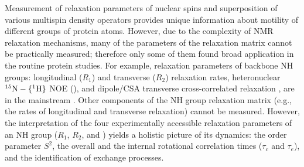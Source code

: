 \documentclass[twocolumn]{svjour3}           %
\begin{document}
Measurement of relaxation parameters of nuclear spins and superposition
of various multispin density operators provides unique information about motility
of different groups of protein atoms. However, due to the complexity of
NMR relaxation mechanisms, many of the parameters of the relaxation 
matrix cannot be practically measured; therefore only some of them 
found broad application in the routine protein studies. For example, 
relaxation parameters of backbone NH groups: \nlab{} longitudinal 
($R_1$) and transverse ($R_2$) relaxation rates, heteronuclear 
${}^{15}\text{N}-\{{}^{1}\text{H}\}$ NOE (\sigmaIS), and dipole\slash CSA transverse 
cross-correlated relaxation \gtwoNNH, are in the mainstream 
\cite{ishima_recent_2011,palmer_1.13_2012}.
Other components of the NH group relaxation matrix (e.g., the rates of
\hlab{} longitudinal and transverse relaxation) cannot be measured. 
However, the interpretation of the four experimentally accessible 
relaxation parameters of an NH group ($R_1$, $R_2$, \sigmaIS{} 
and \gtwoNNH) yields a holistic picture of its dynamics: 
the order parameter $S^2$, the overall and the internal rotational 
correlation times ($\tau_c$ and $\tau_e$), and the identification of 
exchange processes. 
\end{document}
